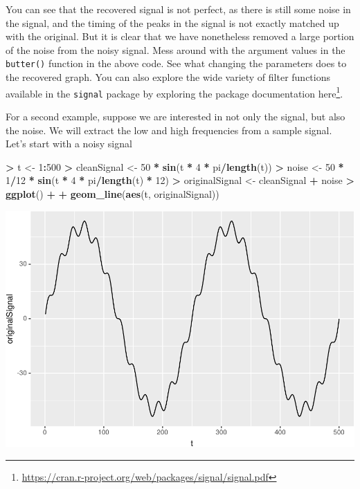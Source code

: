 \documentclass[]{krantz}
\makeatletter
\newenvironment{Shaded}{\begin{snugshade}}{\end{snugshade}}
\newcommand{\DecValTok}[1]{\textcolor[rgb]{0.06,0.06,0.06}{#1}}
\newcommand{\KeywordTok}[1]{\textcolor[rgb]{0.27,0.27,0.27}{\textbf{#1}}}
\newcommand{\NormalTok}[1]{#1}
\newcommand{\OperatorTok}[1]{\textcolor[rgb]{0.43,0.43,0.43}{\textbf{#1}}}
\newcommand{\StringTok}[1]{\textcolor[rgb]{0.5,0.5,0.5}{#1}}
\renewcommand{\href}[2]{#2\footnote{\url{#1}}}
\newenvironment{kframe}{%
\medskip{}
\setlength{\fboxsep}{.8em}
 \def\at@end@of@kframe{}%
 \ifinner\ifhmode%
  \def\at@end@of@kframe{\end{minipage}}%
  \begin{minipage}{\columnwidth}%
 \fi\fi%
 \def\FrameCommand##1{\hskip\@totalleftmargin \hskip-\fboxsep
 \colorbox{shadecolor}{##1}\hskip-\fboxsep
     \hskip-\linewidth \hskip-\@totalleftmargin \hskip\columnwidth}%
 \MakeFramed {\advance\hsize-\width
   \@totalleftmargin\z@ \linewidth\hsize
   \@setminipage}}%
 {\par\unskip\endMakeFramed%
 \at@end@of@kframe}
\renewenvironment{Shaded}{\begin{kframe}}{\end{kframe}}
\makeatother
\begin{document}
You can see that the recovered signal is not perfect, as there is still some noise in the signal, and the timing of the peaks in the signal is not exactly matched up with the original. But it is clear that we have nonetheless removed a large portion of the noise from the noisy signal. Mess around with the argument values in the \texttt{butter()} function in the above code. See what changing the parameters does to the recovered graph. You can also explore the wide variety of filter functions available in the \texttt{signal} package by exploring the package documentation \href{https://cran.r-project.org/web/packages/signal/signal.pdf}{here}.

For a second example, suppose we are interested in not only the signal, but also the noise. We will extract the low and high frequencies from a sample signal. Let's start with a noisy signal

\begin{Shaded}
\begin{Highlighting}[]
\OperatorTok{>}\StringTok{ }\NormalTok{t <-}\StringTok{ }\DecValTok{1}\OperatorTok{:}\DecValTok{500}
\OperatorTok{>}\StringTok{ }\NormalTok{cleanSignal <-}\StringTok{ }\DecValTok{50} \OperatorTok{*}\StringTok{ }\KeywordTok{sin}\NormalTok{(t }\OperatorTok{*}\StringTok{ }\DecValTok{4} \OperatorTok{*}\StringTok{ }\NormalTok{pi}\OperatorTok{/}\KeywordTok{length}\NormalTok{(t))}
\OperatorTok{>}\StringTok{ }\NormalTok{noise <-}\StringTok{ }\DecValTok{50} \OperatorTok{*}\StringTok{ }\DecValTok{1}\OperatorTok{/}\DecValTok{12} \OperatorTok{*}\StringTok{ }\KeywordTok{sin}\NormalTok{(t }\OperatorTok{*}\StringTok{ }\DecValTok{4} \OperatorTok{*}\StringTok{ }\NormalTok{pi}\OperatorTok{/}\KeywordTok{length}\NormalTok{(t) }\OperatorTok{*}\StringTok{ }\DecValTok{12}\NormalTok{)}
\OperatorTok{>}\StringTok{ }\NormalTok{originalSignal <-}\StringTok{ }\NormalTok{cleanSignal }\OperatorTok{+}\StringTok{ }\NormalTok{noise}
\OperatorTok{>}\StringTok{ }\KeywordTok{ggplot}\NormalTok{() }\OperatorTok{+}\StringTok{ }
\OperatorTok{+}\StringTok{   }\KeywordTok{geom_line}\NormalTok{(}\KeywordTok{aes}\NormalTok{(t, originalSignal))}
\end{Highlighting}
\end{Shaded}

\includegraphics{bookdown_files/figure-latex/unnamed-chunk-312-1.pdf}
\end{document}
